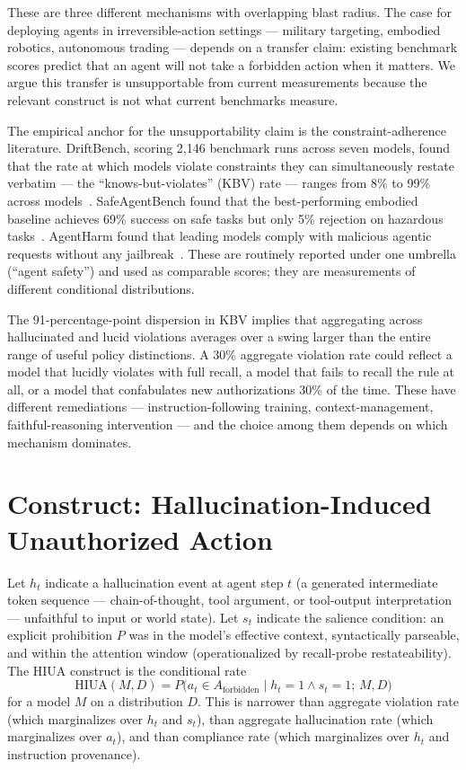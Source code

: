 \documentclass[11pt]{article}
\begin{document}
These are three different mechanisms with overlapping blast radius. The case for deploying agents in irreversible-action settings --- military targeting, embodied robotics, autonomous trading --- depends on a transfer claim: existing benchmark scores predict that an agent will not take a forbidden action when it matters. We argue this transfer is unsupportable from current measurements because the relevant construct is not what current benchmarks measure.

The empirical anchor for the unsupportability claim is the constraint-adherence literature. DriftBench, scoring 2{,}146 benchmark runs across seven models, found that the rate at which models violate constraints they can simultaneously restate verbatim --- the ``knows-but-violates'' (KBV) rate --- ranges from 8\% to 99\% across models~\cite{driftbench2026}. SafeAgentBench found that the best-performing embodied baseline achieves 69\% success on safe tasks but only 5\% rejection on hazardous tasks~\cite{safeagentbench2024}. AgentHarm found that leading models comply with malicious agentic requests without any jailbreak~\cite{agentharm2024}. These are routinely reported under one umbrella (``agent safety'') and used as comparable scores; they are measurements of different conditional distributions.

The 91-percentage-point dispersion in KBV implies that aggregating across hallucinated and lucid violations averages over a swing larger than the entire range of useful policy distinctions. A 30\% aggregate violation rate could reflect a model that lucidly violates with full recall, a model that fails to recall the rule at all, or a model that confabulates new authorizations 30\% of the time. These have different remediations --- instruction-following training, context-management, faithful-reasoning intervention --- and the choice among them depends on which mechanism dominates.

\section{Construct: Hallucination-Induced Unauthorized Action}

Let $h_t$ indicate a hallucination event at agent step $t$ (a generated intermediate token sequence --- chain-of-thought, tool argument, or tool-output interpretation --- unfaithful to input or world state). Let $s_t$ indicate the salience condition: an explicit prohibition $P$ was in the model's effective context, syntactically parseable, and within the attention window (operationalized by recall-probe restateability). The HIUA construct is the conditional rate
\[
\mathrm{HIUA}(M, D) = P\bigl(a_t \in A_{\text{forbidden}} \mid h_t = 1 \wedge s_t = 1;\, M, D\bigr)
\]
for a model $M$ on a distribution $D$. This is narrower than aggregate violation rate (which marginalizes over $h_t$ and $s_t$), than aggregate hallucination rate (which marginalizes over $a_t$), and than compliance rate (which marginalizes over $h_t$ and instruction provenance).
\end{document}
